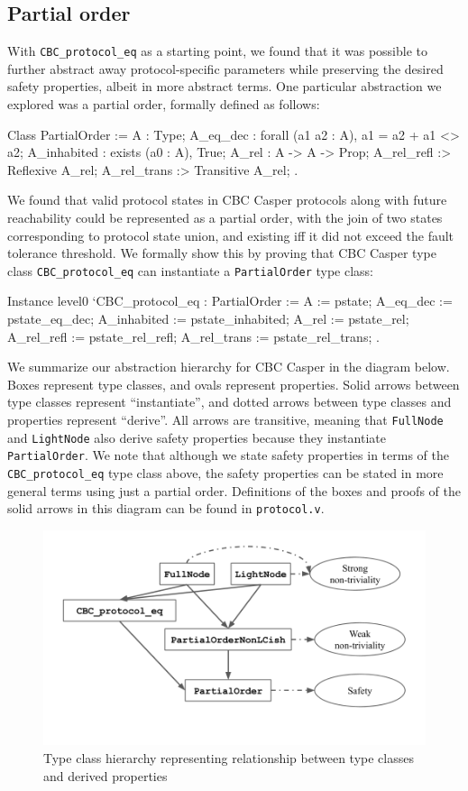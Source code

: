 \documentclass[runningheads]{llncs}
\begin{document}
\subsection{Partial order}
With \verb|CBC_protocol_eq| as a starting point, we found that it was possible to further abstract away protocol-specific parameters while preserving the desired safety properties, albeit in more abstract terms. One particular abstraction we explored was a partial order, formally defined as follows:
\begin{coq}
	Class PartialOrder :=
	{ A : Type;
		A_eq_dec : forall (a1 a2 : A), {a1 = a2} + {a1 <> a2};
		A_inhabited : exists (a0 : A), True;
		A_rel : A -> A -> Prop;
		A_rel_refl :> Reflexive A_rel;
		A_rel_trans :> Transitive A_rel;
	}.
\end{coq} 	
We found that valid protocol states in CBC Casper protocols along with future reachability could be represented as a partial order, with the join of two states corresponding to protocol state union, and existing iff it did not exceed the fault tolerance threshold. We formally show this by proving that CBC Casper type class \verb|CBC_protocol_eq| can instantiate a \verb|PartialOrder| type class:
\begin{coq}
	Instance level0 `{CBC_protocol_eq} : PartialOrder :=
	{ A := pstate;
		A_eq_dec := pstate_eq_dec;
		A_inhabited := pstate_inhabited;
		A_rel := pstate_rel;
		A_rel_refl := pstate_rel_refl;
		A_rel_trans := pstate_rel_trans;
	}.
\end{coq}
We summarize our abstraction hierarchy for CBC Casper in the diagram below. Boxes represent type classes, and ovals represent properties. Solid arrows between type classes represent ``instantiate'', and dotted arrows between type classes and properties represent ``derive''. All arrows are transitive, meaning that \verb|FullNode| and \verb|LightNode| also derive safety properties because they instantiate \verb|PartialOrder|. We note that although we state safety properties in terms of the \verb|CBC_protocol_eq| type class above, the safety properties can be stated in more general terms using just a partial order. Definitions of the boxes and proofs of the solid arrows in this diagram can be found in \verb|protocol.v|.
\begin{figure}
	\centering
	\includegraphics[scale = 0.3]{Flowchart.png}
	\caption{Type class hierarchy representing relationship between type classes and derived properties}
	\label{fig:flowchart}
\end{figure}
\end{document}
